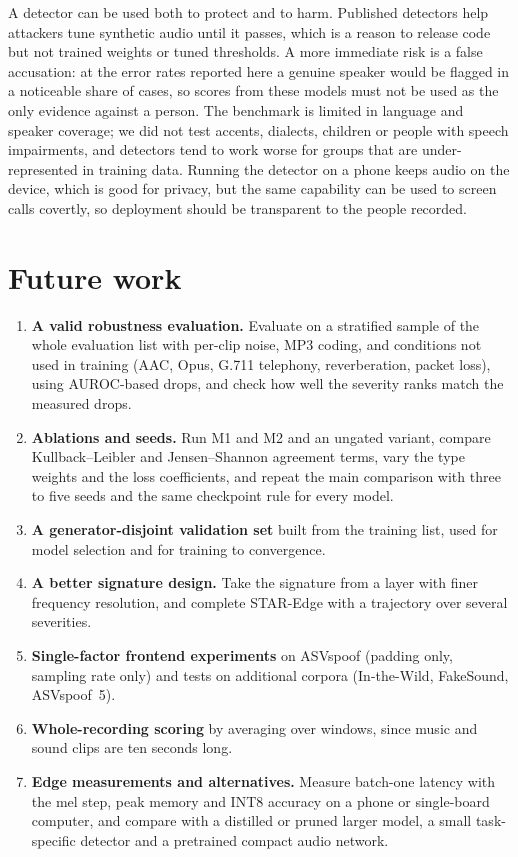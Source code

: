\documentclass[12pt,a4paper]{report}
\begin{document}
A detector can be used both to protect and to harm. Published detectors help attackers tune synthetic audio until it passes, which is a reason to release code but not trained weights or tuned thresholds. A more immediate risk is a false accusation: at the error rates reported here a genuine speaker would be flagged in a noticeable share of cases, so scores from these models must not be used as the only evidence against a person. The benchmark is limited in language and speaker coverage; we did not test accents, dialects, children or people with speech impairments, and detectors tend to work worse for groups that are under-represented in training data. Running the detector on a phone keeps audio on the device, which is good for privacy, but the same capability can be used to screen calls covertly, so deployment should be transparent to the people recorded.

\section{Future work}

\begin{enumerate}[label=\textbf{\arabic*.},leftmargin=*,itemsep=0.3em]
  \item \textbf{A valid robustness evaluation.} Evaluate on a stratified sample of the whole evaluation list with per-clip noise, MP3 coding, and conditions not used in training (AAC, Opus, G.711 telephony, reverberation, packet loss), using AUROC-based drops, and check how well the severity ranks match the measured drops.
  \item \textbf{Ablations and seeds.} Run M1 and M2 and an ungated variant, compare Kullback--Leibler and Jensen--Shannon agreement terms, vary the type weights and the loss coefficients, and repeat the main comparison with three to five seeds and the same checkpoint rule for every model.
  \item \textbf{A generator-disjoint validation set} built from the training list, used for model selection and for training to convergence.
  \item \textbf{A better signature design.} Take the signature from a layer with finer frequency resolution, and complete STAR-Edge with a trajectory over several severities.
  \item \textbf{Single-factor frontend experiments} on ASVspoof (padding only, sampling rate only) and tests on additional corpora (In-the-Wild, FakeSound, ASVspoof~5).
  \item \textbf{Whole-recording scoring} by averaging over windows, since music and sound clips are ten seconds long.
  \item \textbf{Edge measurements and alternatives.} Measure batch-one latency with the mel step, peak memory and INT8 accuracy on a phone or single-board computer, and compare with a distilled or pruned larger model, a small task-specific detector and a pretrained compact audio network.
\end{enumerate}
\end{document}
